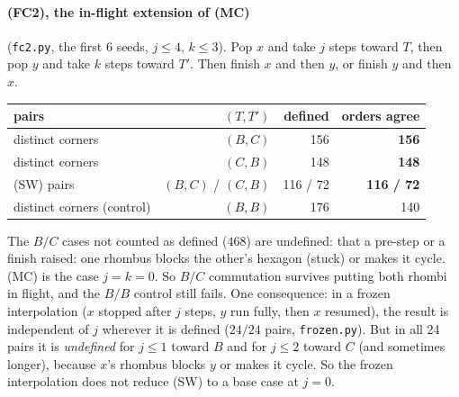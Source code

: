 \documentclass[11pt]{article}
\theoremstyle{definition}\newtheorem{definition}[theorem]{Definition}\newtheorem{remark}[theorem]{Remark}
\begin{document}
\paragraph{(FC2), the in-flight extension of (MC)} (\texttt{fc2.py}, the first 6 seeds, $j\le4$, $k\le3$). Pop $x$ and take $j$ steps toward
$T$, then pop $y$ and take $k$ steps toward $T'$. Then finish $x$ and then $y$, or finish $y$ and then $x$.
\begin{center}\small\begin{tabular}{lrrr}\toprule
pairs & $(T,T')$ & defined & orders agree\\\midrule
distinct corners & $(B,C)$ & 156 & \textbf{156}\\
distinct corners & $(C,B)$ & 148 & \textbf{148}\\
(SW) pairs & $(B,C)$ / $(C,B)$ & 116 / 72 & \textbf{116 / 72}\\
distinct corners (control) & $(B,B)$ & 176 & 140\\\bottomrule
\end{tabular}\end{center}
The $B/C$ cases not counted as defined ($468$) are undefined: that a pre-step or a finish raised: one rhombus blocks the other's hexagon (stuck) or makes it cycle. (MC) is the case $j=k=0$.
So $B/C$ commutation survives putting both rhombi in flight, and the $B/B$ control still fails. One consequence: in a frozen
interpolation ($x$ stopped after $j$ steps, $y$ run fully, then $x$ resumed), the result is independent of $j$ wherever it is defined
($24/24$ pairs, \texttt{frozen.py}). But in all 24 pairs it is \emph{undefined} for $j\le1$ toward $B$ and for $j\le2$ toward $C$ (and sometimes longer), because $x$'s rhombus blocks $y$ or makes it cycle.
So the frozen interpolation does not reduce (SW) to a base case at $j=0$.
\end{document}
